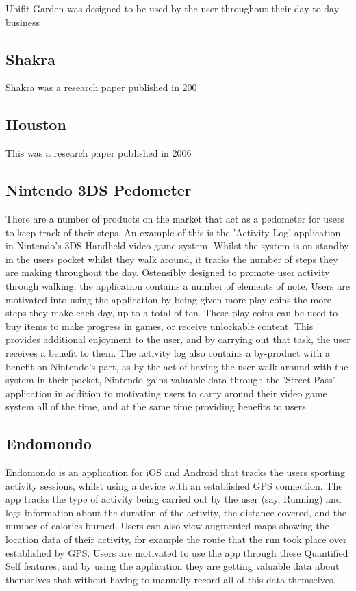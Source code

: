 \documentclass{l4proj}
\begin{document}
Ubifit Garden was designed to be used by the user throughout their day to day business 

\subsection{Shakra}

Shakra was a research paper published in 200

\subsection{Houston}

This was a research paper published in 2006 

\subsection{Nintendo 3DS Pedometer}

There are a number of products on the market that act as a pedometer for users to keep track of their steps. An example of this is the 'Activity Log' application in Nintendo's 3DS Handheld video game system. Whilst the system is on standby in the users pocket whilst they walk around, it tracks the number of steps they are making throughout the day. Ostensibly designed to promote user activity through walking, the application contains a number of elements of note. Users are motivated into using the application by being given more play coins the more steps they make each day, up to a total of ten. These play coins can be used to buy items to make progress in games, or receive unlockable content. This provides additional enjoyment to the user, and by carrying out that task, the user receives a benefit to them. The activity log also contains a by-product with a benefit on Nintendo's part, as by the act of having the user walk around with the system in their pocket, Nintendo gains valuable data through the 'Street Pass' application in addition to motivating users to carry around their video game system all of the time, and at the same time providing benefits to users.

\subsection{Endomondo}

Endomondo is an application for iOS and Android that tracks the users sporting activity sessions, whilst using a device with an established GPS connection. The app tracks the type of activity being carried out by the user (say, Running) and logs information about the duration of the activity, the distance covered, and the number of calories burned. Users can also view augmented maps showing the location data of their activity, for example the route that the run took place over established by GPS. Users are motivated to use the app through these Quantified Self features, and by using the application they are getting valuable data about themselves that without having to manually record all of this data themselves.
\end{document}
